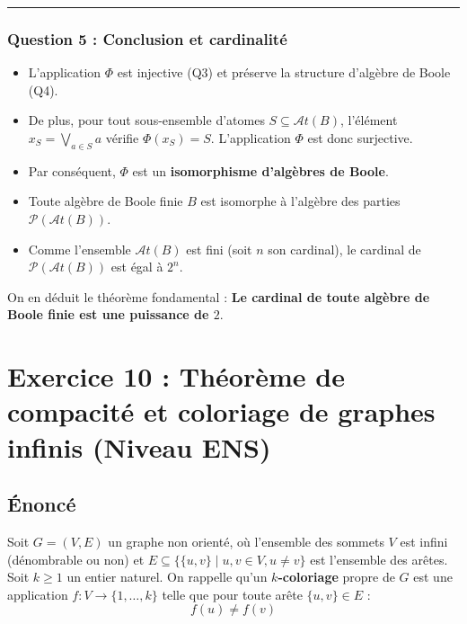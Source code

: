 \documentclass[11pt,a4paper]{article}
\begin{document}
\begin{center}\rule{0.5\linewidth}{0.5pt}\end{center}

\hypertarget{question-5-conclusion-et-cardinalituxe9}{%
\subsubsection{Question 5 : Conclusion et
cardinalité}\label{question-5-conclusion-et-cardinalituxe9}}

\begin{itemize}
\tightlist
\item
  L'application \(\Phi\) est injective (Q3) et préserve la structure
  d'algèbre de Boole (Q4).
\item
  De plus, pour tout sous-ensemble d'atomes
  \(S \subseteq \mathcal{A}t(B)\), l'élément
  \(x_S = \bigvee_{a \in S} a\) vérifie \(\Phi(x_S) = S\). L'application
  \(\Phi\) est donc surjective.
\item
  Par conséquent, \(\Phi\) est un \textbf{isomorphisme d'algèbres de
  Boole}.
\item
  Toute algèbre de Boole finie \(B\) est isomorphe à l'algèbre des
  parties \(\mathcal{P}(\mathcal{A}t(B))\).
\item
  Comme l'ensemble \(\mathcal{A}t(B)\) est fini (soit \(n\) son
  cardinal), le cardinal de \(\mathcal{P}(\mathcal{A}t(B))\) est égal à
  \(2^n\).
\end{itemize}

On en déduit le théorème fondamental : \textbf{Le cardinal de toute
algèbre de Boole finie est une puissance de \(2\)}.
\n
\hypertarget{exercice-10-thuxe9oruxe8me-de-compacituxe9-et-coloriage-de-graphes-infinis-niveau-ens}{%
\section{Exercice 10 : Théorème de compacité et coloriage de graphes
infinis (Niveau
ENS)}\label{exercice-10-thuxe9oruxe8me-de-compacituxe9-et-coloriage-de-graphes-infinis-niveau-ens}}

\hypertarget{uxe9noncuxe9}{%
\subsection{Énoncé}\label{uxe9noncuxe9}}

Soit \(G = (V, E)\) un graphe non orienté, où l'ensemble des sommets
\(V\) est infini (dénombrable ou non) et
\(E \subseteq \{\{u, v\} \mid u, v \in V, u \neq v\}\) est l'ensemble
des arêtes. Soit \(k \ge 1\) un entier naturel. On rappelle qu'un
\textbf{\(k\)-coloriage} propre de \(G\) est une application
\(f : V \to \{1, \dots, k\}\) telle que pour toute arête
\(\{u, v\} \in E\) : \[f(u) \neq f(v)\]
\end{document}
